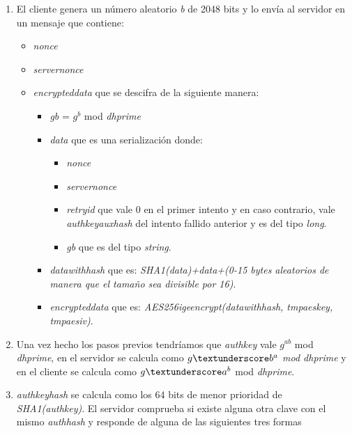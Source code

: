 \begin{enumerate}
	\item El cliente genera un número aleatorio \emph{b} de 2048 bits y lo envía al servidor en un mensaje que contiene:
		\begin{itemize}
			\item \emph{nonce}
			\item \emph{server\textunderscore nonce}
			\item \emph{encrypted\textunderscore data} que se descifra de la siguiente manera:
				\begin{itemize}
					\item \emph{g\textunderscore b} = $g^b$ mod \emph{dh\textunderscore prime}
					\item \emph{data} que es una serialización donde:
						\begin{itemize}
							\item \emph{nonce}
							\item \emph{server\textunderscore nonce}
							\item \emph{retry\textunderscore id} que vale 0 en el primer intento y en caso contrario, vale \emph{auth\textunderscore key\textunderscore aux\textunderscore hash} del intento fallido anterior y es del tipo \emph{long}.
							\item \emph{g\textunderscore b} que es del tipo \emph{string}.
						\end{itemize}
					\item \emph{data\textunderscore with\textunderscore hash} que es: \emph{SHA1(data)+data+(0-15 bytes aleatorios de manera que el tamaño sea divisible por 16)}.
					\item \emph{encrypted\textunderscore data} que es: \emph{AES256\textunderscore ige\textunderscore encrypt(data\textunderscore with\textunderscore hash, tmp\textunderscore aes\textunderscore key, tmp\textunderscore aes\textunderscore iv)}.
				\end{itemize}
		\end{itemize}
	\item Una vez hecho los pasos previos tendríamos que \emph{auth\textunderscore key} vale $g^{ab}$ mod \emph{dh\textunderscore prime}, en el servidor se calcula como \emph{$g\textunderscore b^{a}$ mod \emph{dh\textunderscore prime}} y en el cliente se calcula como $g\textunderscore a^b$ mod \emph{dh\textunderscore prime}.
	\item \emph{auth\textunderscore key\textunderscore hash} se calcula como los 64 bits de menor prioridad de \emph{SHA1(auth\textunderscore key)}. El servidor comprueba si existe alguna otra clave con el mismo \emph{auth\textunderscore hash} y responde de alguna de las siguientes tres formas

\end{enumerate}
